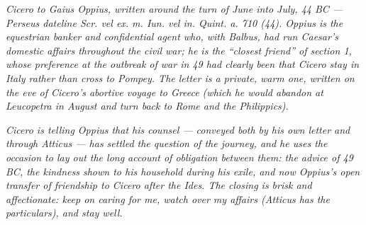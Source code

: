 
\textit{Cicero to Gaius Oppius, written around the turn of June
into July, 44 BC --- Perseus dateline \textit{Scr. vel ex. m.
Iun. vel in. Quint. a. 710 (44)}. Oppius is the equestrian
banker and confidential agent who, with Balbus, had run
Caesar's domestic affairs throughout the civil war; he is the
``closest friend'' of section 1, whose preference at the
outbreak of war in 49 had clearly been that Cicero stay in
Italy rather than cross to Pompey. The letter is a private,
warm one, written on the eve of Cicero's abortive voyage to
Greece (which he would abandon at Leucopetra in August and
turn back to Rome and the Philippics).}

\textit{Cicero is telling Oppius that his counsel --- conveyed
both by his own letter and through Atticus --- has settled
the question of the journey, and he uses the occasion to lay
out the long account of obligation between them: the advice
of 49 BC, the kindness shown to his household during his
exile, and now Oppius's open transfer of friendship to Cicero
after the Ides. The closing is brisk and affectionate: keep
on caring for me, watch over my affairs (Atticus has the
particulars), and stay well.}
